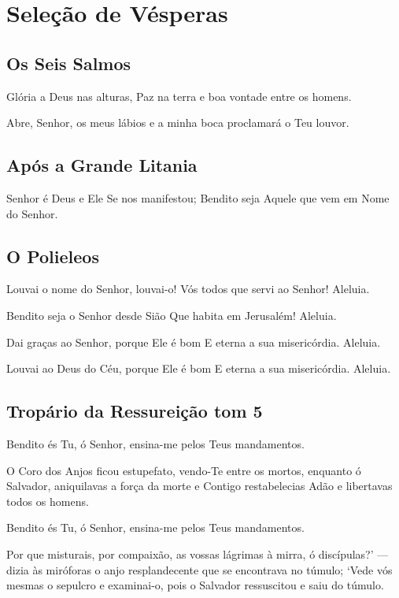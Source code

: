 \documentclass{subfiles}
\begin{document}
\chapter{Seleção de Vésperas}

\section*{Os Seis Salmos}

Glória a Deus nas alturas, Paz na terra e boa vontade entre os homens. \thrice{}

Abre, Senhor, os meus lábios e a minha boca proclamará o Teu louvor. 

\section*{Após a Grande Litania}

Senhor é Deus e Ele Se nos manifestou;
Bendito seja Aquele que vem em Nome do Senhor.


\section*{O Polieleos}

Louvai o nome do Senhor, louvai-o! Vós todos que servi ao Senhor! Aleluia.
\thrice{}

Bendito seja o Senhor desde Sião Que habita em Jerusalém! Aleluia. \thrice{}

Dai graças ao Senhor, porque Ele é bom E eterna a sua misericórdia. Aleluia.
\thrice{}

Louvai ao Deus do Céu, porque Ele é bom E eterna a sua misericórdia.
Aleluia. \thrice{}

\section*{Tropário da Ressureição tom 5}

Bendito és Tu, ó Senhor, ensina-me pelos Teus mandamentos.

O Coro dos Anjos ficou estupefato, vendo-Te entre os mortos, enquanto ó
Salvador, aniquilavas a força da morte e Contigo restabelecias Adão e libertavas
todos os homens.

Bendito és Tu, ó Senhor, ensina-me pelos Teus mandamentos.

Por que misturais, por compaixão, as vossas lágrimas à mirra, ó discípulas?’ —
dizia às miróforas o anjo resplandecente que se encontrava no túmulo; ‘Vede vós
mesmas o sepulcro e examinai-o, pois o Salvador ressuscitou e saiu do túmulo.
\end{document}
